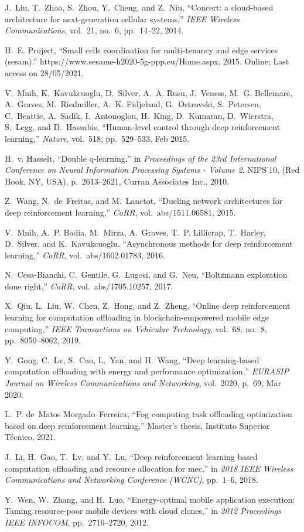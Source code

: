 \documentclass[conference]{IEEEtran}
\begin{document}
\begin{thebibliography}{1}
J.~Liu, T.~Zhao, S.~Zhou, Y.~Cheng, and Z.~Niu, ``Concert: a cloud-based
  architecture for next-generation cellular systems,'' {\em IEEE Wireless
  Communications}, vol.~21, no.~6, pp.~14--22, 2014.

H.~E. Project, ``Small cells coordination for multi-tenancy and edge services
  (sesam).'' https://www.sesame-h2020-5g-ppp.eu/Home.aspx, 2015.
\newblock Online; Last access on 28/05/2021.

V.~Mnih, K.~Kavukcuoglu, D.~Silver, A.~A. Rusu, J.~Veness, M.~G. Bellemare,
  A.~Graves, M.~Riedmiller, A.~K. Fidjeland, G.~Ostrovski, S.~Petersen,
  C.~Beattie, A.~Sadik, I.~Antonoglou, H.~King, D.~Kumaran, D.~Wierstra,
  S.~Legg, and D.~Hassabis, ``Human-level control through deep reinforcement
  learning,'' {\em Nature}, vol.~518, pp.~529--533, Feb 2015.

H.~v. Hasselt, ``Double q-learning,'' in {\em Proceedings of the 23rd
  International Conference on Neural Information Processing Systems - Volume
  2}, NIPS'10, (Red Hook, NY, USA), p.~2613–2621, Curran Associates Inc.,
  2010.

Z.~Wang, N.~de~Freitas, and M.~Lanctot, ``Dueling network architectures for
  deep reinforcement learning,'' {\em CoRR}, vol.~abs/1511.06581, 2015.

V.~Mnih, A.~P. Badia, M.~Mirza, A.~Graves, T.~P. Lillicrap, T.~Harley,
  D.~Silver, and K.~Kavukcuoglu, ``Asynchronous methods for deep reinforcement
  learning,'' {\em CoRR}, vol.~abs/1602.01783, 2016.

N.~Cesa{-}Bianchi, C.~Gentile, G.~Lugosi, and G.~Neu, ``Boltzmann exploration
  done right,'' {\em CoRR}, vol.~abs/1705.10257, 2017.

X.~Qiu, L.~Liu, W.~Chen, Z.~Hong, and Z.~Zheng, ``Online deep reinforcement
  learning for computation offloading in blockchain-empowered mobile edge
  computing,'' {\em IEEE Transactions on Vehicular Technology}, vol.~68, no.~8,
  pp.~8050--8062, 2019.

Y.~Gong, C.~Lv, S.~Cao, L.~Yan, and H.~Wang, ``Deep learning-based computation
  offloading with energy and performance optimization,'' {\em EURASIP Journal
  on Wireless Communications and Networking}, vol.~2020, p.~69, Mar 2020.

L.~P. de~Matos Morgado~Ferreira, ``Fog computing task offloading optimization
  based on deep reinforcement learning,'' Master's thesis, Instituto Superior
  Técnico, 2021.

J.~Li, H.~Gao, T.~Lv, and Y.~Lu, ``Deep reinforcement learning based
  computation offloading and resource allocation for mec,'' in {\em 2018 IEEE
  Wireless Communications and Networking Conference (WCNC)}, pp.~1--6, 2018.

Y.~Wen, W.~Zhang, and H.~Luo, ``Energy-optimal mobile application execution:
  Taming resource-poor mobile devices with cloud clones,'' in {\em 2012
  Proceedings IEEE INFOCOM}, pp.~2716--2720, 2012.

\end{thebibliography}
\end{document}
